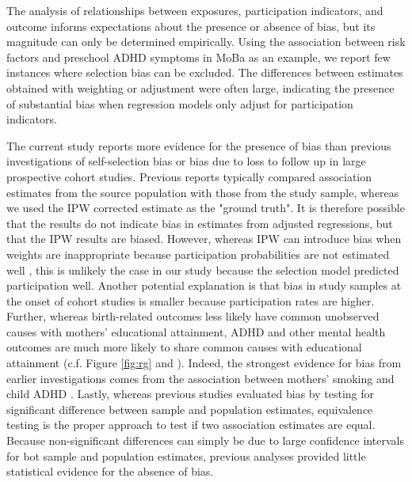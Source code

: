 \documentclass[]{article}
\begin{document}
The analysis of relationships between exposures, participation indicators, and outcome informs expectations about the presence or absence of bias, but its magnitude can only be determined empirically. Using the association between risk factors and preschool ADHD symptoms in MoBa as an example, we report few instances where selection bias can be excluded. The differences between estimates obtained with weighting or adjustment were often large, indicating the presence of substantial bias when regression models only adjust for participation indicators.

The current study reports more evidence for the presence of bias than previous investigations of self-selection bias \supercite{Nilsen2009-ci, Nohr2006-uf} or bias due to loss to follow up \supercite{Greene2011-am, Wolke2009-lu} in large prospective cohort studies. Previous reports typically compared association estimates from the source population with those from the study sample, whereas we used the IPW corrected estimate as the "ground truth". It is therefore possible that the results do not indicate bias in estimates from adjusted regressions, but that the IPW results are biased. However, whereas IPW can introduce bias when weights are inappropriate because participation probabilities are not estimated well \supercite{Seaman2013-rj}, this is unlikely the case in our study because the selection model predicted participation well. Another potential explanation is that bias in study samples at the onset of cohort studies is smaller because participation rates are higher. Further, whereas birth-related outcomes \supercite{Nilsen2009-ci, Nohr2006-uf} less likely have common unobserved causes with mothers' educational attainment\supercite{Goldenberg2008-xe}, ADHD and other mental health outcomes are much more likely to share common causes with educational attainment (c.f. Figure \ref{fig:rg} and \supercite{Hagenaars2016-di}). Indeed, the strongest evidence for bias from earlier investigations comes from the association between mothers' smoking and child ADHD \supercite{Greene2011-am}. Lastly, whereas previous studies evaluated bias by testing for significant difference between sample and population estimates, equivalence testing\supercite{Schuirmann1987-ip, Mascha2011-um} is the proper approach to test if two association estimates are equal. Because non-significant differences can simply be due to large confidence intervals for bot sample and population estimates, previous analyses provided little statistical evidence for the absence of bias. 
\end{document}
